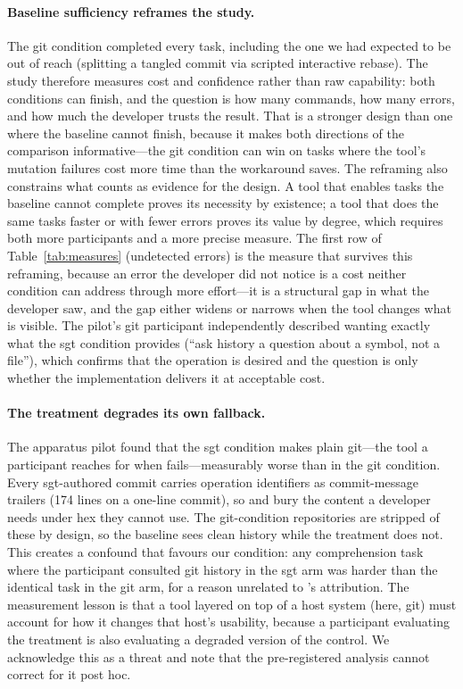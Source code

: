 \paragraph{Baseline sufficiency reframes the study.}
The git condition completed every task, including the one we had expected to be
out of reach (splitting a tangled commit via scripted interactive rebase). The
study therefore measures cost and confidence rather than raw capability: both
conditions can finish, and the question is how many commands, how many errors,
and how much the developer trusts the result. That is a stronger design than one
where the baseline cannot finish, because it makes both directions of the
comparison informative---the git condition can win on tasks where the tool's
mutation failures cost more time than the workaround saves. The reframing also
constrains what counts as evidence for the design. A tool that enables tasks the
baseline cannot complete proves its necessity by existence; a tool that does the
same tasks faster or with fewer errors proves its value by degree, which requires
both more participants and a more precise measure. The first row of
Table~\ref{tab:measures} (undetected errors) is the measure that survives this
reframing, because an error the developer did not notice is a cost neither
condition can address through more effort---it is a structural gap in what the
developer saw, and the gap either widens or narrows when the tool changes what
is visible. The pilot's git participant independently described wanting exactly
what the sgt condition provides (``ask history a question about a symbol, not
a file''), which confirms that the operation is desired and the question is only
whether the implementation delivers it at acceptable cost.

\paragraph{The treatment degrades its own fallback.}
The apparatus pilot found that the sgt condition makes plain git---the tool a
participant reaches for when \sgt{} fails---measurably worse than in the git
condition. Every sgt-authored commit carries operation identifiers as
commit-message trailers (174 lines on a one-line commit), so  and
 bury the content a developer needs under hex they cannot use. The
git-condition repositories are stripped of these by design, so the baseline sees
clean history while the treatment does not. This creates a confound that favours
our condition: any comprehension task where the participant consulted git history
in the sgt arm was harder than the identical task in the git arm, for a reason
unrelated to \sgt{}'s attribution. The measurement lesson is that a tool layered
on top of a host system (here, git) must account for how it changes that host's
usability, because a participant evaluating the treatment is also evaluating a
degraded version of the control. We acknowledge this as a threat and note that
the pre-registered analysis cannot correct for it post hoc.

